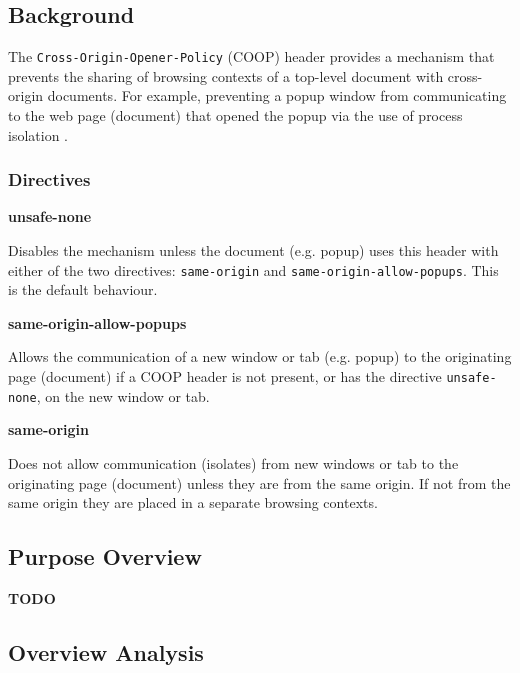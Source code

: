 \documentclass{mscreport}
\begin{document}
\subsection{Background}

The \texttt{Cross-Origin-Opener-Policy} (COOP) header provides a mechanism that prevents the sharing of browsing contexts of a top-level document with cross-origin documents. For example, preventing a popup window from communicating to the web page (document) that opened the popup via the use of process isolation \cite{Apple_undated-gj}.

\subsubsection{Directives}
\textbf{unsafe-none}

\vspace{0.3cm} \noindent
Disables the mechanism unless the document (e.g. popup) uses this header with either of the two directives: \texttt{same-origin} and \texttt{same-origin-allow-popups}. This is the default behaviour.

\vspace{0.7cm} \noindent
\textbf{same-origin-allow-popups}

\vspace{0.3cm} \noindent
Allows the communication of a new window or tab (e.g. popup) to the originating page (document) if a COOP header is not present, or has the directive \texttt{unsafe-none}, on the new window or tab.

\vspace{0.7cm} \noindent
\textbf{same-origin}

\vspace{0.3cm} \noindent
Does not allow communication (isolates) from new windows or tab to the originating page (document) unless they are from the same origin. If not from the same origin they are placed in a separate browsing contexts.

\subsection{Purpose Overview}

\textbf{TODO}

\clearpage
\newpage

\subsection{Overview Analysis}
\end{document}
